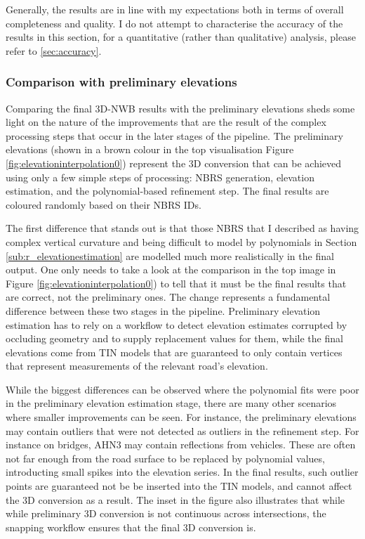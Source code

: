 Generally, the results are in line with my expectations both in terms of overall completeness and quality. I do not attempt to characterise the accuracy of the results in this section, for a quantitative (rather than qualitative) analysis, please refer to \ref{sec:accuracy}.

\subsubsection{Comparison with preliminary elevations}

Comparing the final 3D-NWB results with the preliminary elevations sheds some light on the nature of the improvements that are the result of the complex processing steps that occur in the later stages of the pipeline. The preliminary elevations (shown in a brown colour in the top visualisation Figure \ref{fig:elevationinterpolation0}) represent the 3D conversion that can be achieved using only a few simple steps of processing: NBRS generation, elevation estimation, and the polynomial-based refinement step. The final results are coloured randomly based on their NBRS IDs.

The first difference that stands out is that those NBRS that I described as having complex vertical curvature and being difficult to model by polynomials in Section \ref{sub:r_elevationestimation} are modelled much more realistically in the final output. One only needs to take a look at the comparison in the top image in Figure \ref{fig:elevationinterpolation0}) to tell that it must be the final results that are correct, not the preliminary ones. The change represents a fundamental difference between these two stages in the pipeline. Preliminary elevation estimation has to rely on a workflow to detect elevation estimates corrupted by occluding geometry and to supply replacement values for them, while the final elevations come from TIN models that are guaranteed to only contain vertices that represent measurements of the relevant road's elevation.

While the biggest differences can be observed where the polynomial fits were poor in the preliminary elevation estimation stage, there are many other scenarios where smaller improvements can be seen. For instance, the preliminary elevations may contain outliers that were not detected as outliers in the refinement step. For instance on bridges, AHN3 may contain reflections from vehicles. These are often not far enough from the road surface to be replaced by polynomial values, introducting small spikes into the elevation series. In the final results, such outlier points are guaranteed not be be inserted into the TIN models, and cannot affect the 3D conversion as a result. The inset in the figure also illustrates that while while preliminary 3D conversion is not continuous across intersections, the snapping workflow ensures that the final 3D conversion is.

